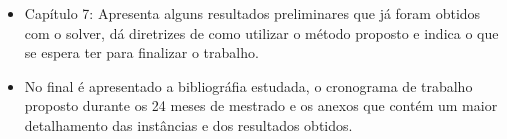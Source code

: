 \begin{itemize}
\item Capítulo 7: Apresenta alguns resultados preliminares que já foram obtidos com o solver, dá diretrizes de como utilizar o método proposto e indica o que se espera ter para finalizar o trabalho.

\item No final é apresentado a bibliográfia estudada, o cronograma de trabalho proposto durante os 24 meses de mestrado e os anexos que contém um maior detalhamento das instâncias e dos resultados obtidos.

\end{itemize}